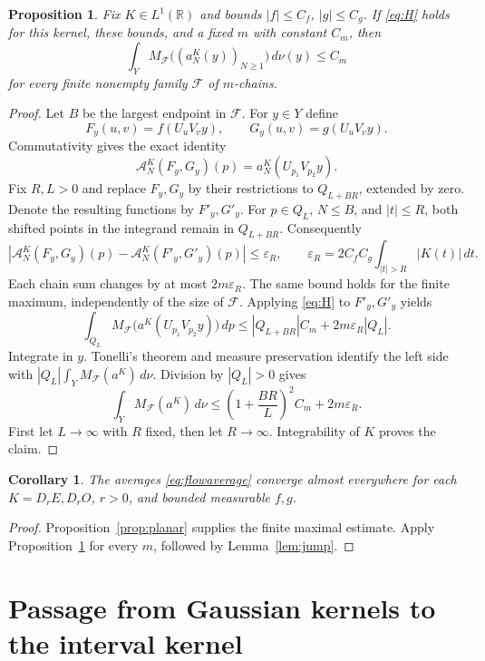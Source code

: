 \documentclass[11pt,a4paper]{article}
\newtheorem{proposition}[theorem]{Proposition}
\newtheorem{corollary}[theorem]{Corollary}
\theoremstyle{definition}
\newenvironment{statementframe}
  {\par\addvspace{4pt}\noindent
   \setlength{\fboxsep}{6pt}\setlength{\fboxrule}{0.45pt}%
   \begin{lrbox}{\statementbox}%
   \begin{minipage}{\dimexpr\linewidth-2\fboxsep-2\fboxrule\relax}}
  {\end{minipage}\end{lrbox}%
   \fbox{\usebox{\statementbox}}\par\addvspace{4pt}}
\newcommand{\R}{\mathbb R}
\newcommand{\1}{\mathbf1}
\newcommand{\A}{\mathcal A}
\newcommand{\F}{\mathcal F}
\begin{document}
\begin{statementframe}
\begin{proposition}\label{prop:transfer}
Fix $K\in L^1(\R)$ and bounds $|f|\le C_f$, $|g|\le C_g$.
If \eqref{eq:H} holds for this kernel, these bounds, and a fixed $m$
with constant $C_m$, then
\[
 \int_Y M_{\F}\bigl((a_N^K(y))_{N\ge1}\bigr)\,d\nu(y)\le C_m
\]
for every finite nonempty family $\F$ of $m$-chains.
\end{proposition}
\end{statementframe}
\begin{proof}
Let $B$ be the largest endpoint in $\F$. For $y\in Y$ define
\[
 F_y(u,v)=f(U_uV_vy),\qquad G_y(u,v)=g(U_uV_vy).
\]
Commutativity gives the exact identity
\[
 \A_N^K(F_y,G_y)(p)=a_N^K(U_{p_1}V_{p_2}y).
\]
Fix $R,L>0$ and replace $F_y,G_y$ by their restrictions to $Q_{L+BR}$,
extended by zero. Denote the resulting functions by $F'_y,G'_y$.
For $p\in Q_L$, $N\le B$, and $|t|\le R$, both shifted points in the
integrand remain in $Q_{L+BR}$. Consequently
\[
 |\A_N^K(F_y,G_y)(p)-\A_N^K(F'_y,G'_y)(p)|
 \le \varepsilon_R,
 \qquad \varepsilon_R=2C_fC_g\int_{|t|>R}|K(t)|\,dt.
\]
Each chain sum changes by at most $2m\varepsilon_R$. The same bound
holds for the finite maximum, independently of the size of $\F$.
Applying \eqref{eq:H} to $F'_y,G'_y$ yields
\[
 \int_{Q_L}M_{\F}\bigl(a^K(U_{p_1}V_{p_2}y)\bigr)\,dp
 \le |Q_{L+BR}|C_m+2m\varepsilon_R|Q_L|.
\]
Integrate in $y$. Tonelli's theorem and measure preservation identify
the left side with $|Q_L|\int_Y M_{\F}(a^K)\,d\nu$. Division by
$|Q_L|>0$ gives
\[
 \int_Y M_{\F}(a^K)\,d\nu
 \le \left(1+\frac{BR}{L}\right)^2C_m+2m\varepsilon_R.
\]
First let $L\to\infty$ with $R$ fixed, then let $R\to\infty$.
Integrability of $K$ proves the claim.
\end{proof}

\begin{statementframe}
\begin{corollary}\label{cor:euler}
The averages \eqref{eq:flowaverage} converge almost everywhere
for each $K=D_rE,D_rO$, $r>0$, and bounded measurable $f,g$.
\end{corollary}
\end{statementframe}
\begin{proof}
Proposition~\ref{prop:planar} supplies the finite maximal estimate.
Apply Proposition~\ref{prop:transfer} for every $m$, followed by
Lemma~\ref{lem:jump}.
\end{proof}

\section{Passage from Gaussian kernels to the interval kernel}
\end{document}
